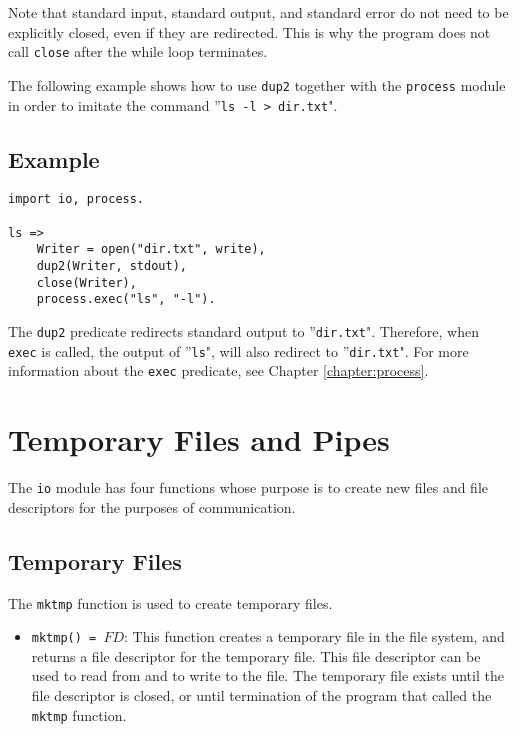 {Note that standard input, standard output, and standard error do not need to be explicitly closed, even if they are redirected.  This is why the program does not call \texttt{close} after the while loop terminates.

The following example shows how to use \texttt{dup2} together with the \texttt{process} module in order to imitate the command ''\texttt{ls -l > dir.txt}".

\subsection*{Example}
\begin{verbatim}
import io, process.

ls =>
    Writer = open("dir.txt", write),
    dup2(Writer, stdout),
    close(Writer),
    process.exec("ls", "-l").
\end{verbatim}

The \texttt{dup2} predicate redirects standard output to ''\texttt{dir.txt}".  Therefore, when \texttt{exec} is called, the output of ''\texttt{ls}", will also redirect to ''\texttt{dir.txt}".  For more information about the \texttt{exec} predicate, see Chapter \ref{chapter:process}.

\section{Temporary Files and Pipes}
The \texttt{io} module has four functions whose purpose is to create new files and file descriptors for the purposes of communication.

\subsection{Temporary Files}
The \texttt{mktmp} function is used to create temporary files.
\begin{itemize}
\item \texttt{mktmp() = $FD$}: This function creates a temporary file in the file system, and returns a file descriptor for the temporary file.  This file descriptor can be used to read from and to write to the file.  The temporary file exists until the file descriptor is closed, or until termination of the program that called the \texttt{mktmp} function.
\end{itemize}

}
